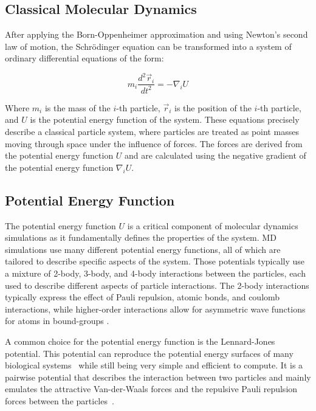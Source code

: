 \subsection{Classical Molecular Dynamics}

After applying the Born-Oppenheimer approximation and using Newton's second law of motion, the Schrödinger equation can be transformed into a system of ordinary differential equations of the form:

\begin{equation}
      m_i \frac{d^2 \vec{r}_i}{dt^2} = -\nabla_i U
\end{equation}

Where $m_i$ is the mass of the $i$-th particle, $\vec{r}_i$ is the position of the $i$-th particle, and $U$ is the potential energy function of the system. These equations precisely describe a classical particle system, where particles are treated as point masses moving through space under the influence of forces. The forces are derived from the potential energy function $U$ and are calculated using the negative gradient of the potential energy function $\nabla_i U$.

\subsection{Potential Energy Function}

The potential energy function $U$ is a critical component of molecular dynamics simulations as it fundamentally defines the properties of the system. MD simulations use many different potential energy functions, all of which are tailored to describe specific aspects of the system. Those potentials typically use a mixture of 2-body, 3-body, and 4-body interactions between the particles, each used to describe different aspects of particle interactions. The 2-body interactions typically express the effect of Pauli repulsion, atomic bonds, and coulomb interactions, while higher-order interactions allow for asymmetric wave functions for atoms in bound-groups \cite{Leimkuhler2015}.

A common choice for the potential energy function is the Lennard-Jones potential. This potential can reproduce the potential energy surfaces of many biological systems~\cite{NexusPhysicsLennardJones} while still being very simple and efficient to compute. It is a pairwise potential that describes the interaction between two particles and mainly emulates the attractive Van-der-Waals forces and the repulsive Pauli repulsion forces between the particles~\cite{ChemieLexikonLennardJones}.

